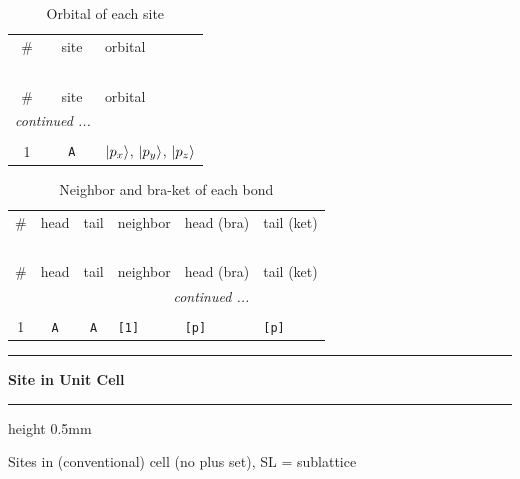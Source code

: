\documentclass[fleqn,10pt,landscape]{jsarticle}
\begin{document}
\renewcommand{\arraystretch}{1.6}
\begin{longtable}[l]{ccl}
\captionsetup{justification=raggedright, singlelinecheck=off}
\caption{Orbital of each site}
 \\
 \hline \hline
\# & site & orbital \\ \hline \endfirsthead

\multicolumn{2}{l}{\tablename\ \thetable{}} \\
 \hline \hline
\# & site & orbital \\ \hline \endhead

 \hline \hline
\multicolumn{2}{r}{\footnotesize\it continued ...} \\ \endfoot

 \hline \hline
\multicolumn{2}{r}{} \\ \endlastfoot

1 & \texttt{A} & $\ket{p_{x}}$, $\ket{p_{y}}$, $\ket{p_{z}}$ \\
\end{longtable}
\renewcommand{\arraystretch}{1.6}
\begin{longtable}[l]{ccclll}
\captionsetup{justification=raggedright, singlelinecheck=off}
\caption{Neighbor and bra-ket of each bond}
 \\
 \hline \hline
\# & head & tail & neighbor & head (bra) & tail (ket) \\ \hline \endfirsthead

\multicolumn{5}{l}{\tablename\ \thetable{}} \\
 \hline \hline
\# & head & tail & neighbor & head (bra) & tail (ket) \\ \hline \endhead

 \hline \hline
\multicolumn{5}{r}{\footnotesize\it continued ...} \\ \endfoot

 \hline \hline
\multicolumn{5}{r}{} \\ \endlastfoot

1 & \texttt{A} & \texttt{A} & \texttt{[1]} & \texttt{[p]} & \texttt{[p]} \\
\end{longtable}
\vspace{5mm}
\noindent \rule[0.5mm]{5mm}{0.5mm}\hspace{3mm}\textbf{Site in Unit Cell}\hspace{3mm}\leaders\hrule height 0.5mm\hfill\kern0pt
\vspace{3mm}

\noindent Sites in (conventional) cell (no plus set), SL = sublattice
\end{document}
